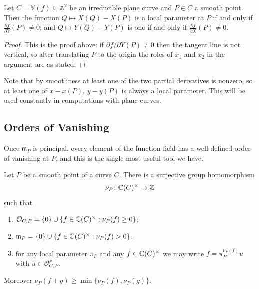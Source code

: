 \documentclass[a4paper]{scrartcl}
\newcommand{\A}{\mathbb{A}}
\newcommand{\V}{\mathbb{V}}
\newcommand{\mm}{\mathfrak{m}}
\newcommand{\Oh}{\mathcal{O}}
\begin{document}
\begin{corollary}\label{cor:localparamplane}
	Let $C = \V(f) \subseteq \A^2$ be an irreducible plane curve and $P \in C$ a smooth point. Then the function $Q \mapsto X(Q) - X(P)$ is a local parameter at $P$ if and only if $\frac{\partial f}{\partial Y}(P) \neq 0$; and $Q \mapsto Y(Q) - Y(P)$ is one if and only if $\frac{\partial f}{\partial X}(P) \neq 0$.
\end{corollary}

\begin{proof}
	This is the proof above: if $\partial f/\partial Y (P) \neq 0$ then the tangent line is not vertical, so after translating $P$ to the origin the roles of $x_1$ and $x_2$ in the argument are as stated.
\end{proof}

Note that by smoothness at least one of the two partial derivatives is nonzero, so at least one of $x - x(P)$, $y - y(P)$ is always a local parameter. This will be used constantly in computations with plane curves.

\subsection{Orders of Vanishing}

Once $\mm_P$ is principal, every element of the function field has a well-defined order of vanishing at $P$, and this is the single most useful tool we have.

\begin{corollary}[Valuation]\label{cor:valuation}
	Let $P$ be a smooth point of a curve $C$. There is a surjective group homomorphism
	$$\nu_P \colon \mathbb{C}(C)^\times \to \mathbb{Z}$$
	such that
	\begin{enumerate}[label=(\roman*)]
		\item $\Oh_{C,P} = \{0\} \cup \{f \in \C(C)^\times : \nu_P(f) \geq 0\}$;
		\item $\mm_P = \{0\} \cup \{f \in \C(C)^\times : \nu_P(f) > 0\}$;
		\item for any local parameter $\pi_P$ and any $f \in \mathbb{C}(C)^\times$ we may write $f = \pi_P^{\nu_P(f)}u$ with $u \in \Oh_{C,P}^\times$.
	\end{enumerate}
	Moreover $\nu_P(f+g) \geq \min\{\nu_P(f),\nu_P(g)\}$.
\end{corollary}
\end{document}
